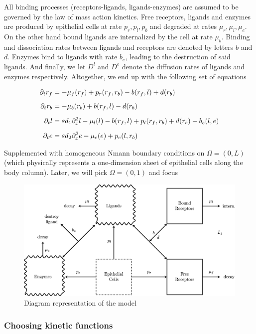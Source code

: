 All binding processes (receptors-ligands, ligands-enzymes) are assumed to be governed by the law of mass action kinetics.  Free receptors, ligands and enzymes are produced by epithelial cells at rate $p_r, p_l, p_b$ and degraded at rates $\mu_r, \mu_l, \mu_e$. On the other hand bound ligands are internalized by the cell at rate $\mu_b$. Binding and dissociation rates between ligands and receptors are denoted by letters $b$ and $d$. Enzymes bind to ligands with rate $b_e$, leading to the destruction of said ligands. And finally, we let $D^l$ and $D^e$ denote the diffusion rates of ligands and enzymes respectively. Altogether, we end up with the following set of equations

\begin{align}
\partial_t r_f &= -\mu_f(r_f) + p_r(r_f, r_b) - b(r_f, l) + d(r_b) \label{eq:kinrf}\\[0.5em]
\partial_t r_b &= - \mu_b(r_b) + b(r_f, l) - d(r_b) \label{eq:kinrb}\\[0.5em]
\partial_t l &= \varepsilon d_1 \partial_x^2 l - \mu_l(l) - b(r_f, l) + p_l(r_f, r_b) +d(r_b) - b_e(l, e) \label{eq:kinl}\\[0.5em]
\partial_t e &= \varepsilon d_2 \partial_x^2 e - \mu_e(e) + p_e(l, r_b) \label{eq:kine}
\end{align}

Supplemented with homogeneous Nmann boundary conditions on $\Omega = (0, L)$ (which physically represents a one-dimension sheet of epithelial cells along the body column). Later, we will pick $\Omega = (0, 1)$ and focus 


\begin{figure}
	\label{diagram}
	\includegraphics[width=\linewidth]{figures/DIAGRAM_MODEL.png}
	\caption{Diagram representation of the model}
\end{figure}

\subsubsection{Choosing kinetic functions}

